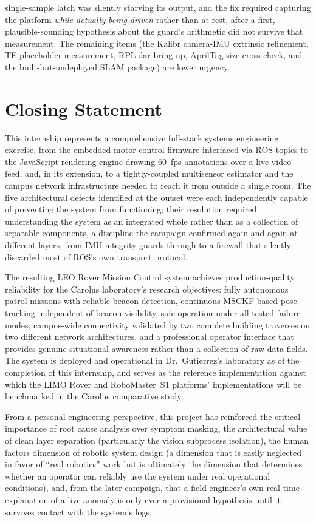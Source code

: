 single-sample latch was silently starving its output, and the fix required capturing the platform \emph{while actually being driven} rather than at rest, after a first, plausible-sounding hypothesis about the guard's arithmetic did not survive that measurement. The remaining items (the Kalibr camera-IMU extrinsic refinement, TF placeholder measurement, RPLidar bring-up, AprilTag size cross-check, and the built-but-undeployed  SLAM package) are lower urgency.

\section{Closing Statement}

This internship represents a comprehensive full-stack systems engineering exercise, from the embedded motor control firmware interfaced via ROS topics to the JavaScript rendering engine drawing 60~fps annotations over a live video feed, and, in its extension, to a tightly-coupled multisensor estimator and the campus network infrastructure needed to reach it from outside a single room. The five architectural defects identified at the outset were each independently capable of preventing the system from functioning; their resolution required understanding the system as an integrated whole rather than as a collection of separable components, a discipline the campaign confirmed again and again at different layers, from IMU integrity guards through to a firewall that silently discarded most of ROS's own transport protocol.

The resulting LEO Rover Mission Control system achieves production-quality reliability for the Carolus laboratory's research objectives: fully autonomous patrol missions with reliable beacon detection, continuous MSCKF-based pose tracking independent of beacon visibility, safe operation under all tested failure modes, campus-wide connectivity validated by two complete building traverses on two different network architectures, and a professional operator interface that provides genuine situational awareness rather than a collection of raw data fields. The system is deployed and operational in Dr.\ Gutierrez's laboratory as of the completion of this internship, and serves as the reference implementation against which the LIMO Rover and RoboMaster~S1 platforms' implementations will be benchmarked in the Carolus comparative study.

From a personal engineering perspective, this project has reinforced the critical importance of root cause analysis over symptom masking, the architectural value of clean layer separation (particularly the vision subprocess isolation), the human factors dimension of robotic system design (a dimension that is easily neglected in favor of ``real robotics'' work but is ultimately the dimension that determines whether an operator can reliably use the system under real operational conditions), and, from the later campaign, that a field engineer's own real-time explanation of a live anomaly is only ever a provisional hypothesis until it survives contact with the system's logs.
